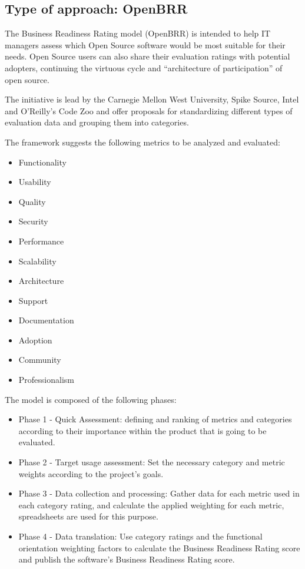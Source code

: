 \documentclass[a4paper,10pt]{article}
\begin{document}
\subsection{Type of approach: OpenBRR}
The Business Readiness Rating model (OpenBRR)\cite{OpenBRRWhitepaper} is
intended to help IT managers
assess which Open Source software would be most suitable for their needs. Open
Source users can also share their evaluation ratings with potential adopters,
continuing the virtuous cycle and “architecture of participation” of open
source.

The initiative is lead by the Carnegie Mellon West University, Spike Source,
Intel and O’Reilly’s Code Zoo and offer proposals for standardizing different
types of evaluation data and grouping them into categories.

The framework suggests the following metrics to be analyzed and evaluated:
\begin{itemize}
\item Functionality
\item Usability
\item Quality
\item Security
\item Performance
\item Scalability
\item Architecture
\item Support
\item Documentation
\item Adoption
\item Community
\item Professionalism
\end{itemize}

The model is composed of the following phases:
\begin{itemize}
\item Phase 1 - Quick Assessment: defining and ranking of metrics and categories
according to their importance within the product that is going to be evaluated.
\item Phase 2 - Target usage assessment: Set the necessary category and metric
weights according to the project's goals.
\item Phase 3 - Data collection and processing: Gather data for each metric used
in each category rating, and calculate the applied weighting for each metric,
spreadsheets are used for this purpose.
\item Phase 4 - Data translation: Use category ratings and the functional
orientation weighting factors to calculate the Business Readiness Rating score
and publish the software’s Business Readiness Rating score.
\end{itemize}
\end{document}
